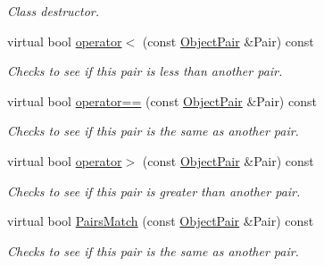 \begin{DoxyCompactItemize}
\begin{DoxyCompactList}\small\item\em Class destructor. \item\end{DoxyCompactList}\item 
virtual bool \hyperlink{classMezzanine_1_1ObjectPair_ae0f6ec9e02fa5e585988d8715f61eccf}{operator$<$} (const \hyperlink{classMezzanine_1_1ObjectPair}{ObjectPair} \&Pair) const 
\begin{DoxyCompactList}\small\item\em Checks to see if this pair is less than another pair. \item\end{DoxyCompactList}\item 
virtual bool \hyperlink{classMezzanine_1_1ObjectPair_a9ef3a1e9a43bd16c0cd9e9db5713dd87}{operator==} (const \hyperlink{classMezzanine_1_1ObjectPair}{ObjectPair} \&Pair) const 
\begin{DoxyCompactList}\small\item\em Checks to see if this pair is the same as another pair. \item\end{DoxyCompactList}\item 
virtual bool \hyperlink{classMezzanine_1_1ObjectPair_a6dd31a9481a2e6fc8893241f1481173c}{operator$>$} (const \hyperlink{classMezzanine_1_1ObjectPair}{ObjectPair} \&Pair) const 
\begin{DoxyCompactList}\small\item\em Checks to see if this pair is greater than another pair. \item\end{DoxyCompactList}\item 
virtual bool \hyperlink{classMezzanine_1_1ObjectPair_aacdc52e1c01f8c4a93323443dfde2059}{PairsMatch} (const \hyperlink{classMezzanine_1_1ObjectPair}{ObjectPair} \&Pair) const 
\begin{DoxyCompactList}\small\item\em Checks to see if this pair is the same as another pair. \item\end{DoxyCompactList}\end{DoxyCompactItemize}
